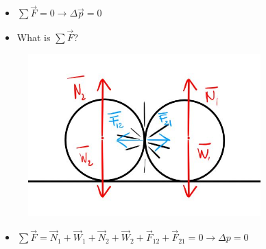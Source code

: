 \documentclass[]{beamer}
\begin{document}
    




\begin{frame}
    \begin{itemize}
        \item $\sum \vec{ F}=0\rightarrow\Delta \vec p =0$
        \pause
        \item What is $\sum \vec F$?
    \end{itemize}
    \pause
    
    
    \begin{figure}[h!]  
        \includegraphics[width=0.8\textwidth]{images/2.jpg}
    
      \end{figure}
  
    
    
      \begin{itemize}
        \item $\sum \vec F=\vec N_1+\vec W_1+\vec N_2+\vec W_2+\vec F_{12}+\vec F_{21}=0\rightarrow \Delta p=0$
    \end{itemize}
    
    
    
        \end{frame}
        
  
\end{document}
